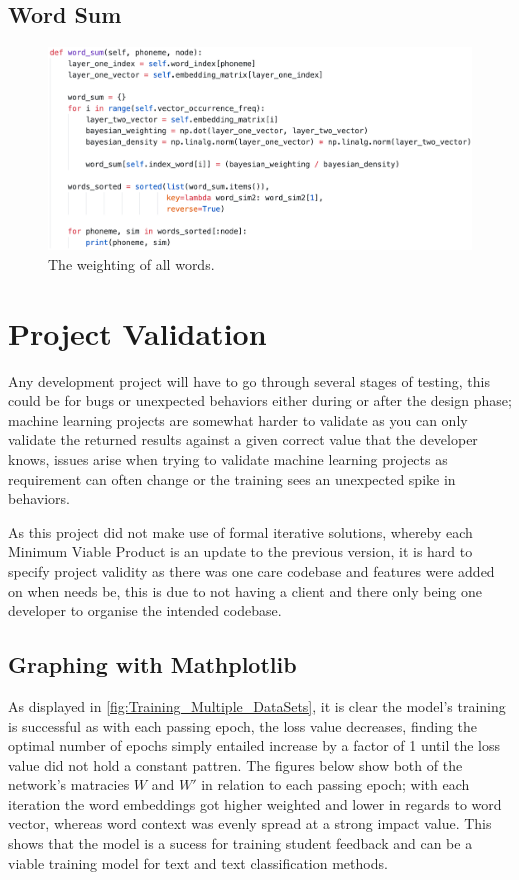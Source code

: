\subsection{Word Sum}

\begin{figure}[H]
    \centering
    \includegraphics[width=\textwidth]{figures/chapter-6/wordsum.png}
    \caption[The weighting of all words]{The weighting of all words.
    \label{fig:wordsum}}
\end{figure}

\section{Project Validation}

Any development project will have to go through several stages of testing, this could be for bugs or unexpected behaviors either during or after the design phase; machine learning projects are somewhat harder to validate as you can only validate the returned results against a given correct value that the developer knows, issues arise when trying to validate machine learning projects as requirement can often change or the training sees an unexpected spike in behaviors.

As this project did not make use of formal iterative solutions, whereby each Minimum Viable Product is an update to the previous version, it is hard to specify project validity as there was one care codebase and features were added on when needs be, this is due to not having a client and there only being one developer to organise the intended codebase.

\subsection{Graphing with Mathplotlib}

As displayed in \autoref{fig:Training_Multiple_DataSets}, it is clear the model's training is successful as with each passing epoch, the loss value decreases, finding the optimal number of epochs simply entailed increase by a factor of 1 until the loss value did not hold a constant pattren. The figures below show both of the network's matracies $W$ and $W'$ in relation to each passing epoch; with each iteration the word embeddings got higher weighted and lower in regards to word vector, whereas word context was evenly spread at a strong impact value. This shows that the model is a sucess for training student feedback and can be a viable training model for text and text classification methods.

